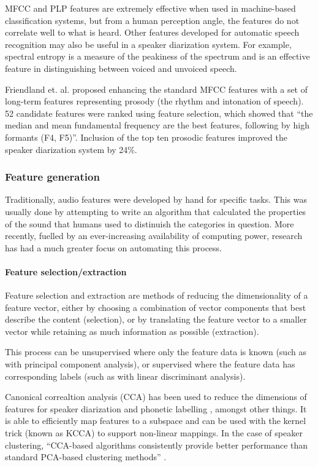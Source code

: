 MFCC and PLP features are extremely effective when used in machine-based
classification systems, but from a human perception angle, the features do not
correlate well to what is heard.  Other features developed for automatic speech
recognition may also be useful in a speaker diarization system. For example,
spectral entropy \cite{Misra2004} is a measure of the peakiness of the spectrum
and is an effective feature in distinguishing between voiced and unvoiced
speech.

Friendland et. al. \cite{Friedland2009} proposed enhancing the standard MFCC
features with a set of long-term features representing prosody (the rhythm and
intonation of speech). 52 candidate features were ranked using feature
selection, which showed that ``the median and mean fundamental frequency are
the best features, following by high formants (F4, F5)''. Inclusion of the
top ten prosodic features improved the speaker diarization system by 24\%.

\subsubsection{Feature generation}\label{sec:litreviewgeneration}
Traditionally, audio features were developed by hand for specific tasks. This
was usually done by attempting to write an algorithm that calculated the
properties of the sound that humans used to distinuish the categories in
question. More recently, fuelled by an ever-increasing availability of
computing power, research has had a much greater focus on automating
this process.

\paragraph{Feature selection/extraction}
Feature selection and extraction are methods of reducing the dimensionality of
a feature vector, either by choosing a combination of vector components that
best describe the content (selection), or by translating the feature vector to
a smaller vector while retaining as much information as possible (extraction).

This process can be unsupervised where only the feature data is known (such as
with principal component analysis), or supervised where the feature data has
corresponding labels (such as with linear discriminant analysis).

Canonical correaltion analysis (CCA) has been used to reduce the dimensions of
features for speaker diarization \cite{Chaudhuri2009} and phonetic labelling
\cite{Arora2014}, amongst other things. It is able to efficiently map features
to a subspace and can be used with the kernel trick (known as KCCA) to support
non-linear mappings. In the case of speaker clustering, ``CCA-based algorithms
consistently provide better performance than standard PCA-based clustering
methods'' \cite{Chaudhuri2009}.

